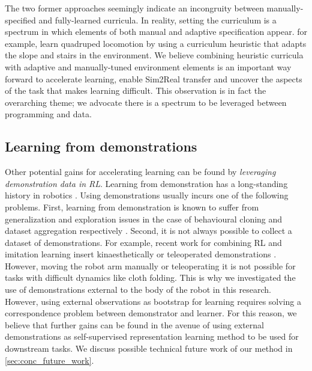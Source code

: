 \documentclass[\home/main.tex]{subfiles}
\begin{document}
The two former approaches  seemingly indicate an incongruity between manually-specified and fully-learned curricula. In reality, setting the curriculum is a spectrum in which elements of both manual and adaptive specification appear. \textcite{rudin2021learning} for example, learn quadruped locomotion by using a curriculum heuristic that adapts the slope and stairs in the environment. 
We believe combining heuristic curricula  with adaptive and manually-tuned environment elements is an important way forward to accelerate learning, enable Sim2Real transfer and uncover the aspects of the task that makes learning difficult. This observation is in fact the overarching theme; we advocate there is a spectrum to be leveraged between programming and data. 

\subsection{Learning from demonstrations}
Other potential gains for accelerating learning can be found by \emph{leveraging demonstration data in RL}. 
Learning from demonstration has a long-standing history in robotics \autocite{Argall2009}. Using demonstrations usually incurs one of the following problems. 
First, learning from demonstration is known to suffer from generalization and exploration issues in the case of behavioural cloning and dataset aggregation respectively \autocite{Ibarz2021}.
Second, it is not always possible to collect a dataset of demonstrations. For example, recent work for combining RL and imitation learning insert kinaesthetically \autocite{vecerik2018leveraging} or teleoperated demonstrations \autocite{Zhu-RSS-18}. However, moving the robot arm manually or teleoperating it is not possible  for tasks with difficult dynamics like cloth folding. This is why we investigated the use of demonstrations external to the body of the robot in this research. However, using external observations as bootstrap for learning requires solving a correspondence problem between demonstrator and learner. For this reason, we believe that further gains can be found in the avenue of using external demonstrations as self-supervised representation learning method to be used for downstream tasks. We discuss possible technical future work of our method in \cref{sec:conc_future_work}. 
\end{document}
